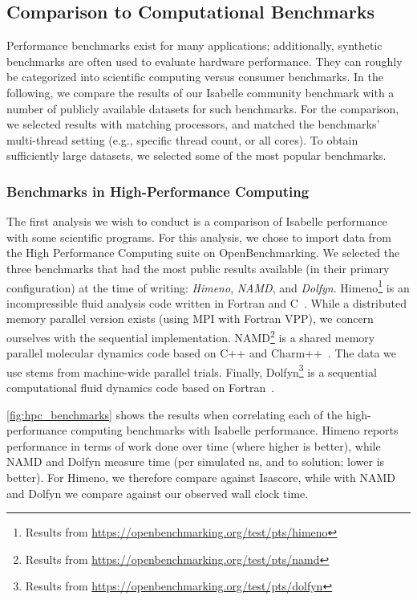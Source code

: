\subsection{Comparison to Computational Benchmarks}
Performance benchmarks exist for many applications;
additionally, synthetic benchmarks are often used to evaluate hardware performance.
They can roughly be categorized into scientific computing versus consumer benchmarks. 
In the following, we compare the results of our Isabelle community benchmark with a number of publicly available datasets for such benchmarks.
For the comparison, we selected results with matching processors,
and matched the benchmarks' multi-thread setting (e.g., specific thread count, or all cores).
To obtain sufficiently large datasets,
we selected some of the most popular benchmarks.

\subsubsection{Benchmarks in High-Performance Computing}
The first analysis we wish to conduct is a comparison of Isabelle performance with some scientific programs.
For this analysis, we chose to import data from the High Performance Computing suite on OpenBenchmarking.
We selected the three benchmarks that had the most public results available
(in their primary configuration)
at the time of writing: \emph{Himeno}, \emph{NAMD}, and \emph{Dolfyn}.
Himeno\footnote{Results from \url{https://openbenchmarking.org/test/pts/himeno}} is an incompressible fluid analysis code written in Fortran and C~\cite{himeno}.
While a distributed memory parallel version exists (using MPI with Fortran VPP),
we concern ourselves with the sequential implementation.
NAMD\footnote{Results from \url{https://openbenchmarking.org/test/pts/namd}} is a shared memory parallel molecular dynamics code based on C++ and Charm++~\cite{namd}.
The data we use stems from machine-wide parallel trials.
Finally, Dolfyn\footnote{Results from \url{https://openbenchmarking.org/test/pts/dolfyn}} is a sequential computational fluid dynamics code based on Fortran~\cite{dolfyn}.



\autoref{fig:hpc_benchmarks} shows the results when correlating each of the high-performance computing benchmarks with Isabelle performance.
Himeno reports performance in terms of work done over time
(where higher is better),
while NAMD and Dolfyn measure time
(per simulated \si{\nano\second}, and to solution;
lower is better).
For Himeno, we therefore compare against Isascore,
while with NAMD and Dolfyn we compare against our observed wall clock time.


